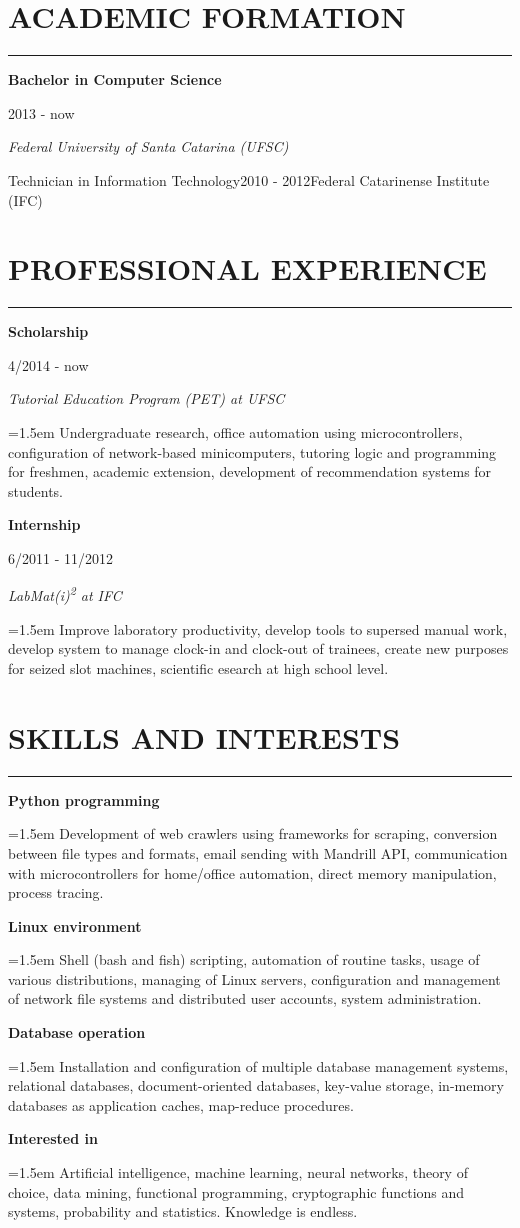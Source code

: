 \documentclass{article}
\def\emcolor{blue!25!black}
\newcommand{\fgem}{\color{\emcolor}}%
\newcommand{\formationentry}[4]{%
	\noindent \textbf{#1} \hfill
	\colorbox{\emcolor}{%
		\parbox[c][1em]{8em}{%
			\hfill \color{white} #2
		}
	} \par
	\noindent \textit{#3} \par
	\normalsize
	\vspace{1em}
}
\newcommand{\experienceentry}[4]{%
	\noindent \textbf{#1} \hfill
	\colorbox{\emcolor}{%
		\parbox[c][1em]{8em}{%
			\hfill \color{white} #2
		}
	} \par
	\noindent \textit{#3} \par
	\noindent \hangindent=1.5em \hangafter=0 \small #4 \par
	\normalsize
	\vspace{1em}
}
\newcommand{\skillentry}[2]{%
	\noindent \textbf{#1} \hfill \par
	\noindent \hangindent=1.5em \hangafter=0 \small #2 \par
	\normalsize
	\vspace{1em}
}
\newenvironment{main}{%
\noindent
\begin{minipage}[t]{\dimexpr0.75\textwidth-1.5em}%
\let\oldsection\section
\renewcommand{\section}[1]{\oldsection*{\uppercase{\fgem ##1}}\vspace{-0.5em}\hrule\vspace{1em}}
}{%
\let\section\oldsection
\end{minipage}%
}
\begin{document}
\begin{main}%
\section{Academic Formation}
\formationentry{Bachelor in Computer Science}{2013 - now}{Federal University
of Santa Catarina (UFSC)}

\formationentry{Technician in Information Technology}{2010 - 2012}{Federal
Catarinense Institute (IFC)}


\section{Professional Experience}
\experienceentry{Scholarship}{4/2014 - now}{Tutorial Education Program (PET) at
UFSC}{Undergraduate research, office automation using microcontrollers, configuration of network-based minicomputers, tutoring logic and programming for freshmen, academic extension, development of recommendation systems for students.}

\experienceentry{Internship}{6/2011 - 11/2012}{LabMat(i)\textsuperscript{2} at
IFC}{Improve laboratory productivity, develop tools to supersed manual work, develop system to manage clock-in and clock-out of trainees, create new purposes for seized slot machines, scientific esearch at high school level.}


\section{Skills and Interests}
\skillentry{Python programming}{Development of web crawlers using frameworks
for scraping, conversion between file types and formats, email sending with
Mandrill API, communication with microcontrollers for home/office automation,
direct memory manipulation, process tracing.}

\skillentry{Linux environment}{Shell (bash and fish) scripting, automation of routine tasks, usage of various distributions, managing of Linux servers, configuration and management of network file systems and distributed user accounts, system administration.}

\skillentry{Database operation}{Installation and configuration of multiple database management systems, relational databases, document-oriented databases, key-value storage, in-memory databases as application caches, map-reduce procedures.}

\skillentry{Interested in}{Artificial intelligence, machine learning, neural networks, theory of choice, data mining, functional programming, cryptographic functions and systems, probability and statistics. Knowledge is endless.}



\end{main}
\end{document}
